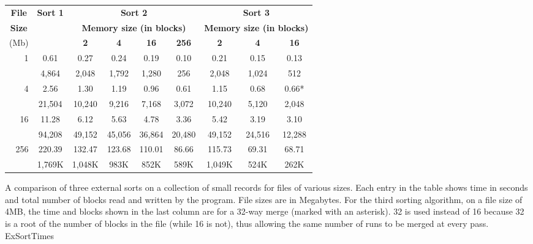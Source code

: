 \begin{mytable}
\begin{center}
{\small
\begin{tabular}{|r|c|cccc|ccc|}
\hline
\multicolumn{1}{|c|}{\textbf{File}}&
\multicolumn{1}{c|}{\textbf{Sort 1}}&
\multicolumn{4}{c|}{\textbf{Sort 2}}&
\multicolumn{3}{c|}{\textbf{Sort 3}}\\
\multicolumn{1}{|c|}{\textbf{Size}}&&
\multicolumn{4}{c|}{\textbf{Memory size (in blocks)}}&
\multicolumn{3}{c|}{\textbf{Memory size (in blocks)}}\\
(Mb)&&\multicolumn{1}{c}{\textbf{2}} &
\multicolumn{1}{c}{\textbf{4}} &
\multicolumn{1}{c}{\textbf{16}} &
\multicolumn{1}{c|}{\textbf{256}} &
\multicolumn{1}{c}{\textbf{2}} &
\multicolumn{1}{c}{\textbf{4}} &
\multicolumn{1}{c|}{\textbf{16}}\\
\hline
  1&   0.61 &   0.27 &   0.24 &   0.19 &   0.10 &   0.21 &   0.15 &   0.13\\
   &  4,864 &  2,048 &  1,792 &  1,280 &    256 &  2,048 &  1,024 &    512\\
\hline
  4&   2.56 &   1.30 &   1.19 &   0.96 &   0.61 &   1.15 &   0.68 &   0.66*\\
   & 21,504 & 10,240 &  9,216 &  7,168 &  3,072 & 10,240 &  5,120 &  2,048\\
\hline
 16&  11.28 &   6.12 &   5.63 &   4.78 &   3.36 &   5.42 &   3.19 &   3.10\\
   & 94,208 & 49,152 & 45,056 & 36,864 & 20,480 & 49,152 & 24,516 & 12,288\\
\hline
256& 220.39 & 132.47 & 123.68 & 110.01 &  86.66 & 115.73 &  69.31 &  68.71\\
   &  1,769K&  1,048K&    983K&    852K&    589K&  1,049K&    524K&   262K\\
\hline
\end{tabular}}
\end{center}
\vspace{-\smallskipamount}

{A comparison of three external sorts on a collection of small
records for files of various sizes.
Each entry in the table shows time in seconds and total number of
blocks read and written by the program.
File sizes are in Megabytes.
For the third sorting algorithm, on a file size of 4MB, the time and
blocks shown in the last column are for a 32-way merge (marked with an
asterisk).
32 is used instead of 16 because 32 is a root of the number of blocks
in the file (while 16 is not), thus allowing the same number of runs
to be merged at every pass.}
{ExSortTimes}
\bigskip
\end{mytable}

